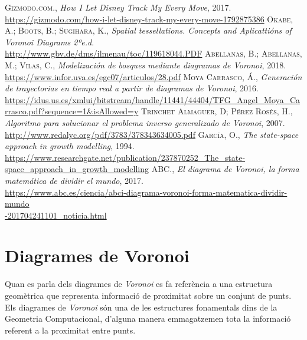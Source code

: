 \documentclass[12pt]{article}
\begin{document}
\clearpage
\begin{thebibliography}{9}
 \textsc{Gizmodo.com.}, \textit{How I Let Disney Track My Every Move}, 2017. 
\\\textcolor{blue}{\url{https://gizmodo.com/how-i-let-disney-track-my-every-move-1792875386}}	
 \textsc{Okabe, A.}; \textsc{Boots, B.}; \textsc{Sugihara, K.}, \textit{Spatial tessellations. Concepts and Aplicattións of \textit{Voronoi} Diagrams 2ºe.d}. 
\\\textcolor{blue}{\url{http://www.gbv.de/dms/ilmenau/toc/119618044.PDF}}
 \textsc{Abellanas, B.}; \textsc{Abellanas, M.}; \textsc{Vilas, C.}, \textit{Modelización de bosques mediante diagramas de \textit{Voronoi}}, 2018. 
\\\textcolor{blue}{\url{https://www.infor.uva.es/egc07/articulos/28.pdf}}
 \textsc{Moya Carrasco, Á.}, \textit{Generación de trayectorias en tiempo real a partir de diagramas de \textit{Voronoi}}, 2016. \\\textcolor{blue}{\url{https://idus.us.es/xmlui/bitstream/handle/11441/44404/TFG_Angel_Moya_Carrasco.pdf?sequence=1&isAllowed=y}}
 \textsc{Trinchet Almaguer, D}; \textsc{Pérez Rosés, H.}, \textit{Algoritmo para solucionar el problema inverso generalizado de \textit{Voronoi}}, 2007. 
\\\textcolor{blue}{\url{http://www.redalyc.org/pdf/3783/378343634005.pdf}}
 \textsc{García, O.}, \textit{The state-space approach in growth modelling}, 1994. 
\\\textcolor{blue}{\url{https://www.researchgate.net/publication/237870252_The_state-space_approach_in_growth_modelling}}
 \textsc{ABC.}, \textit{El diagrama de \textit{Voronoi}, la forma matemática de dividir el mundo}, 2017. 
\\\textcolor{blue}{\url{https://www.abc.es/ciencia/abci-diagrama-voronoi-forma-matematica-dividir-mundo}}
\\\textcolor{blue}{\url{-201704241101_noticia.html}}
\end{thebibliography}

\clearpage
\appendix
\section{Diagrames de Voronoi \label{ann:dvoronoi}}
Quan es parla dels diagrames de \textit{Voronoi} es fa referència a una estructura geomètrica que representa informació de proximitat sobre un conjunt de punts. Els diagrames de \textit{Voronoi} són una de les estructures fonamentals dins de la Geometria Computacional, d’alguna manera emmagatzemen tota la informació referent a la proximitat entre punts.
\end{document}
